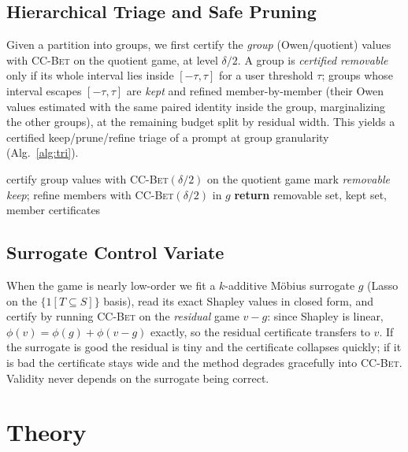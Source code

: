 \documentclass[10pt,twocolumn,letterpaper]{article}
\theoremstyle{plain}
\theoremstyle{definition}
\newcommand{\shap}{\phi}
\begin{document}
\subsection{Hierarchical Triage and Safe Pruning}

Given a partition into groups, we first certify the \emph{group} (Owen/quotient)
values with \textsc{CC-Bet} on the quotient game, at level $\delta/2$. A group is
\emph{certified removable} only if its whole interval lies inside $[-\tau,\tau]$
for a user threshold $\tau$; groups whose interval escapes $[-\tau,\tau]$ are
\emph{kept} and refined member-by-member (their Owen values estimated with the
same paired identity inside the group, marginalizing the other groups), at the
remaining budget split by residual width. This yields a certified
keep/prune/refine triage of a prompt at group granularity (Alg.~\ref{alg:tri}).

\begin{algorithm}[t]
\caption{Certified safe-pruning triage (\textsc{Owen-Elim})}
\label{alg:tri}
\begin{algorithmic}[1]
\State certify group values with \textsc{CC-Bet}$(\delta/2)$ on the quotient game
  \If{$[\ell_g,u_g]\subseteq[-\tau,\tau]$} mark \emph{removable}
  \Else{} \emph{keep}; refine members with \textsc{CC-Bet}$(\delta/2)$ in $g$
  \EndIf
\EndFor
\State \textbf{return} removable set, kept set, member certificates
\end{algorithmic}
\end{algorithm}

\subsection{Surrogate Control Variate}

When the game is nearly low-order we fit a $k$-additive M\"obius surrogate $g$
(Lasso on the $\{1[T\subseteq S]\}$ basis), read its exact Shapley values in
closed form, and certify by running \textsc{CC-Bet} on the \emph{residual} game
$v-g$: since Shapley is linear, $\shap(v)=\shap(g)+\shap(v-g)$ exactly, so the
residual certificate transfers to $v$. If the surrogate is good the residual is
tiny and the certificate collapses quickly; if it is bad the certificate stays
wide and the method degrades gracefully into \textsc{CC-Bet}. Validity never
depends on the surrogate being correct.

\section{Theory}
\label{sec:theory}
\end{document}
